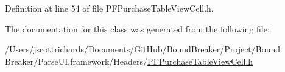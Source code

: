 Definition at line 54 of file P\+F\+Purchase\+Table\+View\+Cell.\+h.



The documentation for this class was generated from the following file\+:\begin{DoxyCompactItemize}
\item 
/\+Users/jscottrichards/\+Documents/\+Git\+Hub/\+Bound\+Breaker/\+Project/\+Bound Breaker/\+Parse\+U\+I.\+framework/\+Headers/\hyperlink{_p_f_purchase_table_view_cell_8h}{P\+F\+Purchase\+Table\+View\+Cell.\+h}\end{DoxyCompactItemize}
